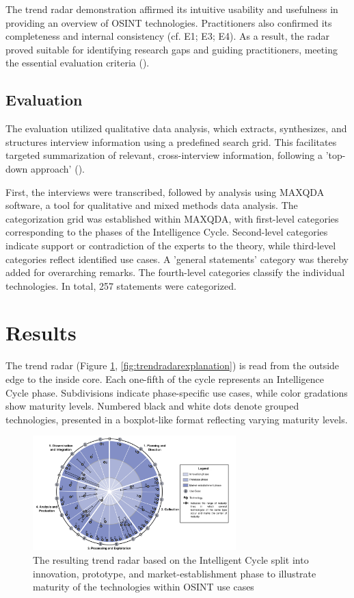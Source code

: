 \documentclass[10pt]{article}
\begin{document}
The trend radar demonstration affirmed its intuitive usability and usefulness in providing an overview of OSINT technologies. Practitioners also confirmed its completeness and internal consistency (cf. E1; E3; E4). As a result, the radar proved suitable for identifying research gaps and guiding practitioners, meeting the essential evaluation criteria (\cite{Sonnenberg.2012}).

\subsection{Evaluation} \label{sec:eval}

The evaluation utilized qualitative data analysis, which extracts, synthesizes, and structures interview information using a predefined search grid. This facilitates targeted summarization of relevant, cross-interview information, following a 'top-down approach' (\cite{Bogner.2014}).

First, the interviews were transcribed, followed by analysis using MAXQDA software, a tool for qualitative and mixed methods data analysis. The categorization grid was established within MAXQDA, with first-level categories corresponding to the phases of the Intelligence Cycle. Second-level categories indicate support or contradiction of the experts to the theory, while third-level categories reflect identified use cases. A 'general statements' category was thereby added for overarching remarks. The fourth-level categories classify the individual technologies. In total, 257 statements were categorized.

\section{Results} \label{sec:results}

The trend radar (Figure \ref{fig:trendradar}, \ref{fig:trendradarexplanation}) is read from the outside edge to the inside core.
Each one-fifth of the cycle represents an Intelligence Cycle phase. Subdivisions indicate
phase-specific use cases, while color gradations show maturity levels. Numbered black
and white dots denote grouped technologies, presented in a boxplot-like format reflecting
varying maturity levels.

\begin{figure}[thb]
    \centering
    \includegraphics[width=0.7\textwidth]{PDF/images/crop_Trendradar}
    \caption{The resulting trend radar based on the Intelligent Cycle split into innovation, prototype, and market-establishment phase to illustrate maturity of the technologies within OSINT use cases}
    \label{fig:trendradar}
\end{figure}
\end{document}
